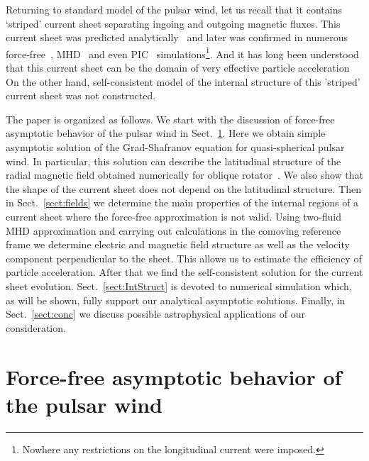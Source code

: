 \documentclass[useAMS,usenatbib]{mn2e}
\begin{document}
Returning to standard model of the pulsar wind, let us recall that it contains `striped' 
current sheet separating ingoing and outgoing magnetic fluxes. This current sheet was predicted 
analytically~\citep{coroniti_striped_wind_1990, michel_pulsar_wind_1994, 1999A&A...349.1017B}
and later was confirmed in numerous force-free~\citep{ckf99, 2006ApJ...648L..51S, 2012MNRAS.420.2793K}, 
MHD~\citep{2006MNRAS.367...19K, 2009ApJ...699.1789T} and even PIC~\citep{2015MNRAS.448..606C}  
simulations\footnote{Nowhere any restrictions on the longitudinal current were imposed.}.
And it has long been understood that this current sheet can be the domain of very effective particle
acceleration~\citep{2001ApJ...547..437L,2007ApJ...670..702Z,2012SSRv..173..341A,2014ApJ...781...46C} 
On the other hand, self-consistent model of the internal structure of this 'striped' current sheet
was not constructed. 

The paper is organized as follows. We start with the discussion of force-free asymptotic 
behavior of the pulsar wind in Sect.~\ref{sect:rest}.  Here we obtain simple asymptotic 
solution of the Grad-Shafranov equation for quasi-spherical pulsar wind. { In 
particular, this solution can describe the latitudinal structure of the radial magnetic field obtained 
numerically for oblique rotator~\citep{2016MNRAS.457.3384T}}. We also show that the shape 
of the current sheet does not depend on the latitudinal structure. Then in Sect.~\ref{sect:fields} 
we determine the main properties of the internal regions of a current sheet where the force-free
approximation is not valid.  Using two-fluid MHD approximation and carrying out calculations 
in the comoving reference frame we determine electric and magnetic field structure as well as 
the velocity component perpendicular to the sheet. This allows us to estimate the efficiency 
of particle acceleration. After that we find the self-consistent solution for the current sheet evolution. 
Sect.~\ref{sect:IntStruct} is devoted to numerical simulation which, as will be shown, 
fully support our analytical asymptotic solutions. Finally, in Sect.~\ref{sect:conc} we discuss 
possible astrophysical applications of our consideration.


\section{Force-free asymptotic behavior of the pulsar wind}
\label{sect:rest}
\end{document}

